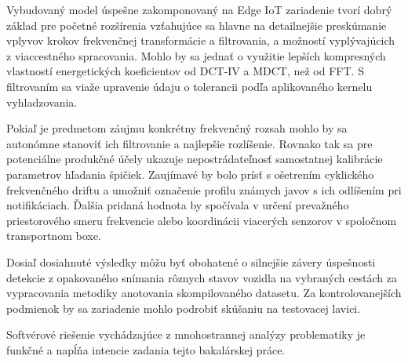 Vybudovaný model úspešne zakomponovaný na Edge IoT zariadenie tvorí dobrý základ pre početné rozšírenia
vzťahujúce sa hlavne na detailnejšie preskúmanie vplyvov krokov frekvenčnej transformácie a filtrovania,
a možností vyplývajúcich z viaccestného spracovania. Mohlo by sa jednať o využitie lepších kompresných vlastností
energetických koeficientov od DCT-IV a MDCT, než od FFT. S filtrovaním sa viaže upravenie údaju o tolerancii podľa
aplikovaného kernelu vyhladzovania.

Pokiaľ je predmetom záujmu konkrétny frekvenčný rozsah mohlo by sa autonómne stanoviť ich filtrovanie a najlepšie rozlíšenie.
Rovnako tak sa pre potenciálne produkčné účely ukazuje nepostrádateľnosť samostatnej kalibrácie parametrov hľadania špičiek.
Zaujímavé by bolo prísť s ošetrením cyklického frekvenčného driftu a umožniť označenie profilu známych javov s ich odlíšením pri
notifikáciach. Ďalšia pridaná hodnota by spočívala v určení prevažného priestorového smeru frekvencie alebo koordinácii viacerých senzorov
v spoločnom transportnom boxe.

Dosiaľ dosiahnuté výsledky môžu byť obohatené o silnejšie závery úspešnosti detekcie z opakovaného snímania rôznych stavov
vozidla na vybraných cestách za vypracovania metodiky anotovania skompilovaného datasetu. Za kontrolovanejších podmienok
by sa zariadenie mohlo podrobiť skúšaniu na testovacej lavici.

Softvérové riešenie vychádzajúce z mnohostrannej analýzy problematiky je funkčné a napĺňa intencie
zadania tejto bakalárskej práce.
\cleardoublepage
